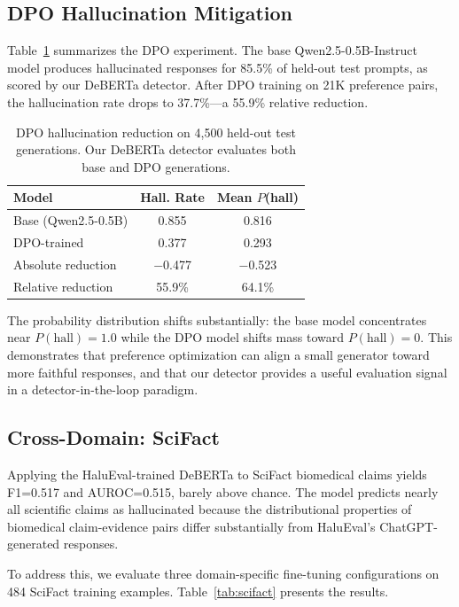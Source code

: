 \documentclass[11pt]{article}
\begin{document}
\subsection{DPO Hallucination Mitigation}

Table~\ref{tab:dpo} summarizes the DPO experiment. The base Qwen2.5-0.5B-Instruct model produces hallucinated responses for 85.5\% of held-out test prompts, as scored by our DeBERTa detector. After DPO training on 21K preference pairs, the hallucination rate drops to 37.7\%---a 55.9\% relative reduction.

\begin{table}[h]
\centering
\small
\begin{tabular}{@{}lcc@{}}
\toprule
\textbf{Model} & \textbf{Hall. Rate} & \textbf{Mean $P$(hall)} \\
\midrule
Base (Qwen2.5-0.5B) & 0.855 & 0.816 \\
DPO-trained & 0.377 & 0.293 \\
\midrule
Absolute reduction & $-$0.477 & $-$0.523 \\
Relative reduction & 55.9\% & 64.1\% \\
\bottomrule
\end{tabular}
\caption{DPO hallucination reduction on 4,500 held-out test generations. Our DeBERTa detector evaluates both base and DPO generations.}
\label{tab:dpo}
\end{table}

The probability distribution shifts substantially: the base model concentrates near $P(\text{hall})=1.0$ while the DPO model shifts mass toward $P(\text{hall})=0$. This demonstrates that preference optimization can align a small generator toward more faithful responses, and that our detector provides a useful evaluation signal in a detector-in-the-loop paradigm.


\subsection{Cross-Domain: SciFact}

Applying the HaluEval-trained DeBERTa to SciFact biomedical claims yields F1=0.517 and AUROC=0.515, barely above chance. The model predicts nearly all scientific claims as hallucinated because the distributional properties of biomedical claim-evidence pairs differ substantially from HaluEval's ChatGPT-generated responses.

To address this, we evaluate three domain-specific fine-tuning configurations on 484 SciFact training examples. Table~\ref{tab:scifact} presents the results.
\end{document}
